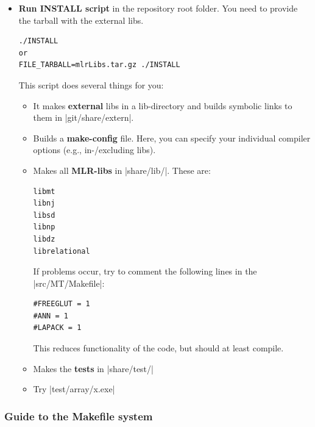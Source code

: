 \begin{itemize}
\item \textbf{Run INSTALL script} in the repository root folder. You
need to provide the tarball with the external libs.
\begin{code}
\begin{verbatim}
./INSTALL
or
FILE_TARBALL=mlrLibs.tar.gz ./INSTALL
\end{verbatim}
\end{code}
This script does several things for you:

\begin{itemize}

\item It makes \textbf{external} libs in a lib-directory and builds
symbolic links to them in |git/share/extern|.


\item Builds a \textbf{make-config} file. Here, you can specify your
individual compiler options (e.g., in-/excluding libs).


\item Makes all \textbf{MLR-libs} in |share/lib/|. These are:
\begin{code}
\begin{verbatim}
libmt
libnj
libsd
libnp
libdz
librelational
\end{verbatim}
\end{code}

If problems occur, try to comment the following lines in the
|src/MT/Makefile|:
\begin{code}
\begin{verbatim}
#FREEGLUT = 1
#ANN = 1
#LAPACK = 1
\end{verbatim}
\end{code}
This reduces functionality of the code, but should at least compile.



\item Makes the \textbf{tests} in |share/test/|


\item Try |test/array/x.exe|

\end{itemize}

\end{itemize}



\subsubsection{Guide to the Makefile system}

